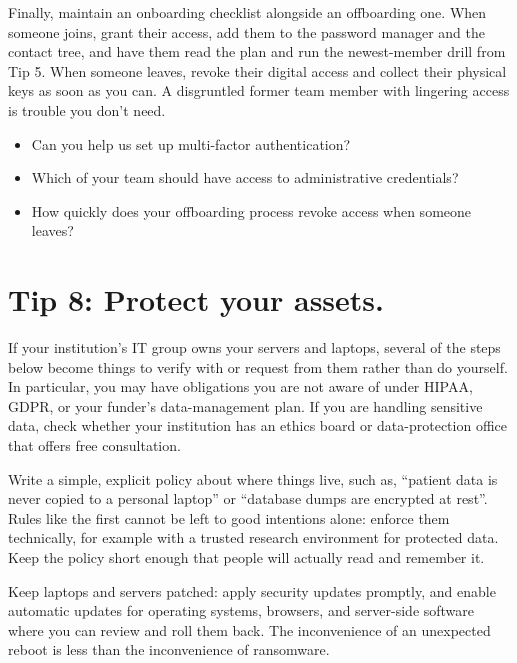 \documentclass[10pt,letterpaper]{article}
\begin{document}
Finally, maintain an onboarding checklist alongside an offboarding one. When
someone joins, grant their access, add them to the password manager and the
contact tree, and have them read the plan and run the newest-member drill from
Tip 5. When someone leaves, revoke their digital access and collect their
physical keys as soon as you can. A disgruntled former team member with
lingering access is trouble you don't need.

\begin{notebox}
  \begin{itemize}
  \item Can you help us set up multi-factor authentication?
  \item Which of your team should have access to administrative credentials?
  \item How quickly does your offboarding process revoke access when someone
    leaves?
  \end{itemize}
\end{notebox}

\section*{Tip 8: Protect your assets.}

\begin{notebox}
  If your institution's IT group owns your servers and laptops, several of the
  steps below become things to verify with or request from them rather than do
  yourself.  In particular, you may have obligations you are not aware of under
  HIPAA, GDPR, or your funder's data-management plan.  If you are handling
  sensitive data, check whether your institution has an ethics board or
  data-protection office that offers free consultation.
\end{notebox}

Write a simple, explicit policy about where things live, such as, ``patient data
is never copied to a personal laptop'' or ``database dumps are encrypted at
rest''. Rules like the first cannot be left to good intentions alone: enforce
them technically, for example with a trusted research environment for protected
data.  Keep the policy short enough that people will actually read and remember
it.

Keep laptops and servers patched: apply security updates promptly, and enable
automatic updates for operating systems, browsers, and server-side software
where you can review and roll them back. The inconvenience of an unexpected
reboot is less than the inconvenience of ransomware.
\end{document}
